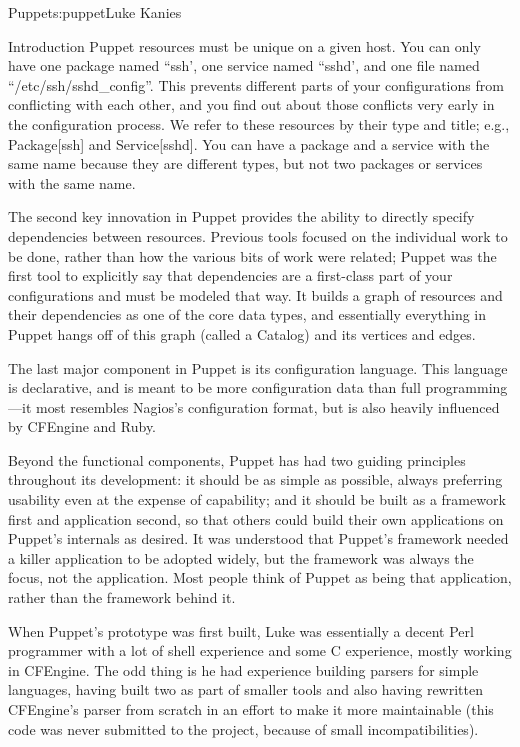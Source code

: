 \begin{aosachapter}{Puppet}{s:puppet}{Luke Kanies}
\begin{aosasect1}{Introduction}
Puppet resources must be unique on a given host.  You can only have
one package named ``ssh', one service named ``sshd', and one file named
``/etc/ssh/sshd\_config''.  This prevents different parts of your
configurations from conflicting with each other, and you find out
about those conflicts very early in the configuration process.  We
refer to these resources by their type and title; e.g., Package[ssh]
and Service[sshd].  You can have a package and a service with the same
name because they are different types, but not two packages or
services with the same name.

The second key innovation in Puppet provides the ability to directly
specify dependencies between resources.  Previous tools focused on the
individual work to be done, rather than how the various bits of work
were related; Puppet was the first tool to explicitly say that
dependencies are a first-class part of your configurations and must
be modeled that way.  It builds a graph of resources and their
dependencies as one of the core data types, and essentially everything
in Puppet hangs off of this graph (called a Catalog)
and its vertices and edges.

The last major component in Puppet is its configuration language.
This language is declarative, and is meant to be more configuration
data than full programming---it most resembles Nagios's configuration
format, but is also heavily influenced by CFEngine and Ruby.

Beyond the functional components, Puppet has had two guiding
principles throughout its development: it should be as simple as
possible, always preferring usability even at the expense of
capability; and it should be built as a framework first and
application second, so that others could build their own applications
on Puppet's internals as desired.  It was understood that Puppet's
framework needed a killer application to be adopted widely, but the
framework was always the focus, not the application.  Most people
think of Puppet as being that application, rather than the framework
behind it.

When Puppet's prototype was first built, Luke was essentially a decent
Perl programmer with a lot of shell experience and some C experience,
mostly working in CFEngine.  The odd thing is he had
experience building parsers for simple languages, having built two as
part of smaller tools and also having rewritten CFEngine's parser from
scratch in an effort to make it more maintainable (this code was never
submitted to the project, because of small incompatibilities).


\end{aosasect1}
\end{aosachapter}
